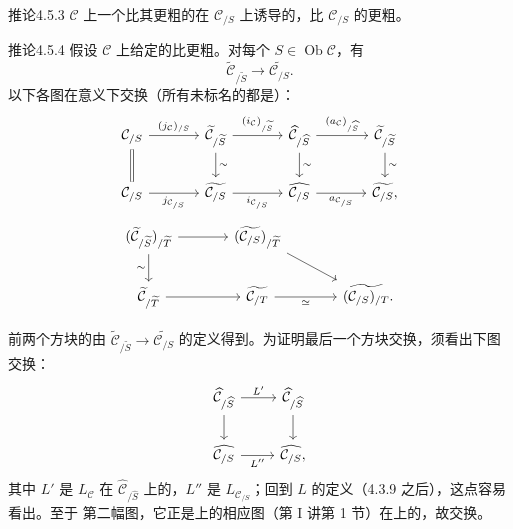 \begin{SGAresult}{推论}{4.5.3}
$\mathcal C$ 上一个比其更粗的在 $\mathcal C_{/S}$ 上诱导的，比 $\mathcal C_{/S}$ 的更粗。
\end{SGAresult}
\begin{SGAresult}{推论}{4.5.4}
假设 $\mathcal C$ 上给定的比更粗。对每个 $S\in\operatorname{Ob}\mathcal C$，有
\[
\widetilde{\mathcal C}_{/\widetilde S}\longrightarrow\widetilde{\mathcal C_{/S}}.
\]
以下各图在意义下交换（所有未标名的都是）：
\[
\begin{tikzcd}[column sep=large]
\mathcal C_{/S}\arrow[r,"(j_{\mathcal C})_{/S}"]\arrow[d,equal]&
\widetilde{\mathcal C}_{/\widetilde S}\arrow[r,"(i_{\mathcal C})_{/\widetilde S}"]\arrow[d,"\sim"]&
\widehat{\mathcal C}_{/\widehat S}\arrow[r,"(a_{\mathcal C})_{/\widehat S}"]\arrow[d,"\sim"]&
\widetilde{\mathcal C}_{/\widetilde S}\arrow[d,"\sim"]\\
\mathcal C_{/S}\arrow[r,"j_{\mathcal C_{/S}}"']&
\widetilde{\mathcal C_{/S}}\arrow[r,"i_{\mathcal C_{/S}}"']&
\widehat{\mathcal C_{/S}}\arrow[r,"a_{\mathcal C_{/S}}"']&
\widetilde{\mathcal C_{/S}},
\end{tikzcd}
\]
\[
\begin{tikzcd}[column sep=large]
(\widetilde{\mathcal C}_{/\widetilde S})_{/\widetilde T}\arrow[r]\arrow[d,"\sim"']&
(\widetilde{\mathcal C_{/S}})_{/\widetilde T}\arrow[dr]\\
\widetilde{\mathcal C}_{/\widetilde T}\arrow[r]&\widetilde{\mathcal C_{/T}}\arrow[r,"\simeq"']&\widetilde{(\mathcal C_{/S})_{/T}}.
\end{tikzcd}
\]
\end{SGAresult}
前两个方块的由 $\widetilde{\mathcal C}_{/\widetilde S}\to\widetilde{\mathcal C_{/S}}$ 的定义得到。为证明最后一个方块交换，须看出下图交换：
\[
\begin{tikzcd}
\widehat{\mathcal C}_{/\widehat S}\arrow[r,"L'"]\arrow[d]&\widehat{\mathcal C}_{/\widehat S}\arrow[d]\\
\widehat{\mathcal C_{/S}}\arrow[r,"L''"']&\widehat{\mathcal C_{/S}},
\end{tikzcd}
\]
其中 $L'$ 是 $L_{\mathcal C}$ 在 $\widehat{\mathcal C}_{/\widehat S}$ 上的，$L''$ 是 $L_{\mathcal C_{/S}}$；回到 $L$ 的定义（4.3.9 之后），这点容易看出。至于
第二幅图，它正是上的相应图（第 I 讲第 1 节）在上的，故交换。

